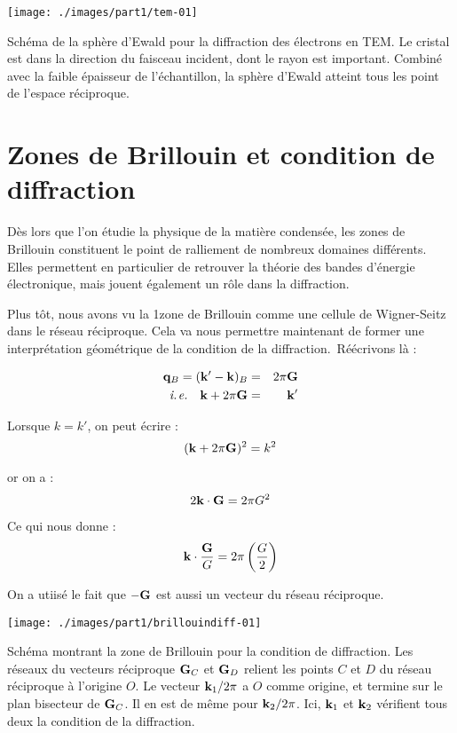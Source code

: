 \begin{marginfigure}
    \texttt{[image: ./images/part1/tem-01]}
    \caption{Schéma de la sphère d'Ewald pour la diffraction des électrons en TEM. Le cristal est dans la direction du faisceau incident, dont le rayon est important. Combiné avec la faible épaisseur de l'échantillon, la sphère d'Ewald atteint tous les point de l'espace réciproque.}
    \label{fig:tem}
\end{marginfigure}



\section{Zones de Brillouin et condition de diffraction}

Dès lors que l'on étudie la physique de la matière condensée, les zones de Brillouin constituent le point de ralliement de nombreux domaines différents. Elles permettent en particulier de retrouver la théorie des bandes d'énergie électronique, mais jouent également un rôle dans la diffraction.

Plus tôt, nous avons vu la 1\iere zone de Brillouin comme une cellule de
Wigner-Seitz dans le réseau réciproque. Cela va nous permettre maintenant de former une interprétation géométrique de la condition de la diffraction. Réécrivons là :

\begin{eqnarray}
    \mathbf{q}_B =(\mathbf{k'-k})_B & =&  2\pi\mathbf{G}\\
    \textit{i.\hspace{1pt}{}e.}\quad \mathbf{k} + 2\pi \mathbf{G} &=& \mathbf{k'}
\end{eqnarray}

Lorsque $k=k'$, on peut écrire :
\begin{equation}
    (\mathbf{k} + 2\pi \mathbf{G})^2 = k^2
\end{equation}

or on a :
\begin{equation}
    2 \mathbf{k\cdot G} = 2\pi G^2
\end{equation}

Ce qui nous donne :
\begin{equation}
    \mathbf{k}\cdot\frac{\mathbf{G}}{G} = 2\pi \left( \frac{G}{2} \right)
\end{equation}

On a utiisé le fait que $-\mathbf{G}$ est aussi un vecteur du réseau réciproque.

\begin{marginfigure}
    \texttt{[image: ./images/part1/brillouindiff-01]}
    \caption{Schéma montrant la zone de Brillouin pour la condition de diffraction. Les réseaux du vecteurs réciproque $\mathbf{G}_C$ et $\mathbf{G}_D$ relient les points $C$ et $D$ du réseau réciproque à l'origine $O$. Le vecteur $\mathbf{k}_1/2\pi$ a $O$ comme origine, et termine sur le plan bisecteur de $\mathbf{G}_C$. Il en est de même pour $\mathbf{k}_2/2\pi$. Ici, $\mathbf{k}_1$ et $\mathbf{k}_2$ vérifient tous deux la condition de la diffraction.}
    \label{fig:brillouindiff-01}
\end{marginfigure}

